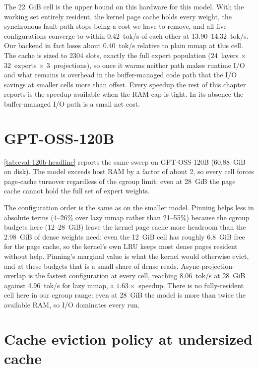 The 22~GiB cell is the upper bound on this hardware for this model.
With the working set entirely resident, the kernel page cache holds every weight, the synchronous fault path stops being a cost we have to remove, and all five configurations converge to within 0.42~tok/s of each other at 13.90--14.32~tok/s.
Our backend in fact loses about 0.40~tok/s relative to plain mmap at this cell. The cache is sized to 2304 slots, exactly the full expert population ($24$~layers $\times$ $32$~experts $\times$ $3$~projections), so once it warms neither path makes runtime I/O and what remains is overhead in the buffer-managed code path that the I/O savings at smaller cells more than offset.
Every speedup the rest of this chapter reports is the speedup available when the RAM cap is tight. In its absence the buffer-managed I/O path is a small net cost.


\section{GPT-OSS-120B}\label{sec:eval-120b}

\autoref{tab:eval-120b-headline} reports the same sweep on GPT-OSS-120B (60.88~GiB on disk).
The model exceeds host RAM by a factor of about 2, so every cell forces page-cache turnover regardless of the cgroup limit; even at 28~GiB the page cache cannot hold the full set of expert weights.

The configuration order is the same as on the smaller model.
Pinning helps less in absolute terms (4--26\% over lazy mmap rather than 21--55\%) because the cgroup budgets here (12--28~GiB) leave the kernel page cache more headroom than the 2.98~GiB of dense weights need: even the 12~GiB cell has roughly 6.8~GiB free for the page cache, so the kernel's own LRU keeps most dense pages resident without help. Pinning's marginal value is what the kernel would otherwise evict, and at these budgets that is a small share of dense reads.
Async-projection-overlap is the fastest configuration at every cell, reaching 8.06~tok/s at 28~GiB against 4.96~tok/s for lazy mmap, a $1.63\times$ speedup.
There is no fully-resident cell here in our cgroup range: even at 28~GiB the model is more than twice the available RAM, so I/O dominates every run.


\section{Cache eviction policy at undersized cache}\label{sec:eval-policy}

